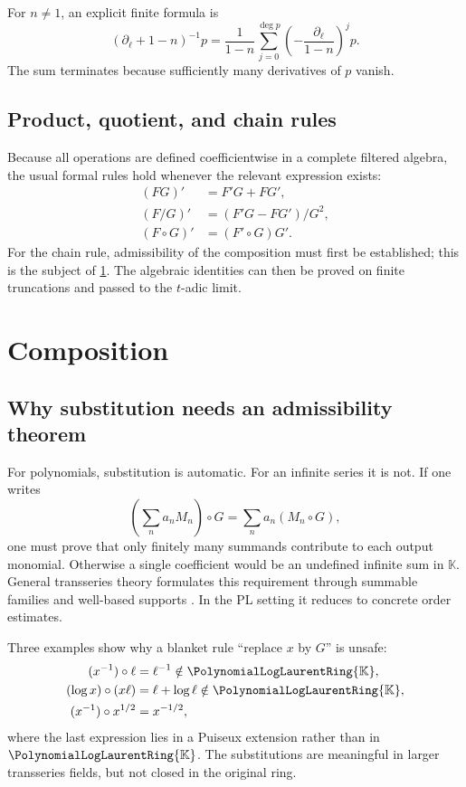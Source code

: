\documentclass[11pt,oneside]{article}
\numberwithin{equation}{section}
\theoremstyle{definition}
\newcommand{\K}{\mathbb{K}}
\newcommand{\PL}{\PolynomialLogLaurentRing{\K}}
\newcommand{\dlog}{\partial_{\ell}}
\begin{document}
For \(n\ne1\), an explicit finite formula is
\begin{equation}\label{eq:antiderivative-explicit}
  (\dlog+1-n)^{-1}p
  =\frac{1}{1-n}\sum_{j=0}^{\deg p}
    \left(-\frac{\dlog}{1-n}\right)^j p.
\end{equation}
The sum terminates because sufficiently many derivatives of \(p\) vanish.

\subsection{Product, quotient, and chain rules}

Because all operations are defined coefficientwise in a complete filtered
algebra, the usual formal rules hold whenever the relevant expression exists:
\begin{align}
 (FG)'&=F'G+FG',\label{eq:product-rule}\\
 (F/G)'&=(F'G-FG')/G^2,\label{eq:quotient-rule}\\
 (F\circ G)'&=(F'\circ G)G'.\label{eq:chain-rule-preview}
\end{align}
For the chain rule, admissibility of the composition must first be established;
this is the subject of \cref{sec:composition}.  The algebraic identities can then
be proved on finite truncations and passed to the \(t\)-adic limit.

\section{Composition}\label{sec:composition}

\subsection{Why substitution needs an admissibility theorem}

For polynomials, substitution is automatic.  For an infinite series it is not.
If one writes
\[
  \left(\sum_n a_nM_n\right)\circ G
  =\sum_n a_n(M_n\circ G),
\]
one must prove that only finitely many summands contribute to each output
monomial.  Otherwise a single coefficient would be an undefined infinite sum in
\(\K\).  General transseries theory formulates this requirement through
summable families and well-based supports \cite{EdgarBeginners,EdgarComposition,
VanDerHoeven2006}.  In the PL setting it reduces to concrete order estimates.

Three examples show why a blanket rule ``replace \(x\) by \(G\)'' is unsafe:
\begin{align*}
  (x^{-1})\circ\ell&=\ell^{-1}\notin\PL,\\
  (\log x)\circ(x\ell)&=\ell+\log\ell\notin\PL,\\
  (x^{-1})\circ x^{1/2}&=x^{-1/2},
\end{align*}
where the last expression lies in a Puiseux extension rather than in \(\PL\).
The substitutions are meaningful in larger transseries fields, but not closed in
the original ring.
\end{document}
